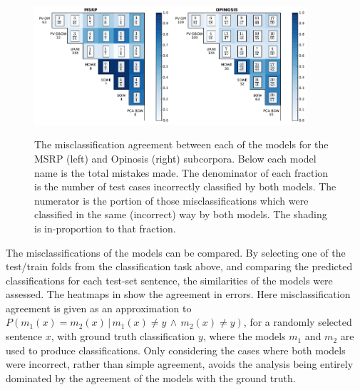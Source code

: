 \documentclass[]{book}
\begin{document}
\begin{figure}
\includegraphics[width=0.45\textwidth]{figs/msrp_agree}\hspace*{\fill}\includegraphics[width=0.45\textwidth]{figs/opinosis_agree}\enspace{}

\caption{\label{fig:misclass_agreement} The misclassification agreement between
each of the models for the MSRP (left) and Opinosis (right) subcorpora.
Below each model name is the total mistakes made. The denominator
of each fraction is the number of test cases incorrectly classified
by both models. The numerator is the portion of those misclassifications
which were classified in the same (incorrect) way by both models.
The shading is in-proportion to that fraction.}
\end{figure}


The misclassifications of the models can be compared. By selecting
one of the test/train folds from the classification task above, and
comparing the predicted classifications for each test-set sentence,
the similarities of the models were assessed. The heatmaps in 
show the agreement in errors. Here misclassification agreement is
given as an approximation to $P(m_{1}(x)=m_{2}(x)\,|\,m_{1}(x)\ne y\,\wedge\,m_{2}(x)\ne y)$,
for a randomly selected sentence $x$, with ground truth classification
$y$, where the models $m_{1}$ and $m_{2}$ are used to produce classifications.
Only considering the cases where both models were incorrect, rather
than simple agreement, avoids the analysis being entirely dominated
by the agreement of the models with the ground truth. 
\end{document}
